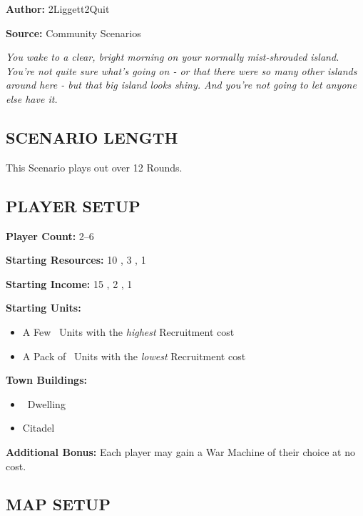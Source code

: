 
\begin{multicols*}{2}

\textbf{Author:} 2Liggett2Quit

\textbf{Source:} Community Scenarios

\textit{You wake to a clear, bright morning on your normally mist-shrouded island. You're not quite sure what's going on - or that there were so many other islands around here - but that big island looks shiny. And you're not going to let anyone else have it.}

\subsection*{\MakeUppercase{Scenario Length}}

This Scenario plays out over 12 Rounds.

\subsection*{\MakeUppercase{Player Setup}}
\textbf{Player Count:} 2--6

\textbf{Starting Resources:} 10 , 3 , 1 

\textbf{Starting Income:} 15 , 2 , 1 

\textbf{Starting Units:}
\begin{itemize}
  \item A Few \bronze\ Units with the \textit{highest} Recruitment cost
  \item A Pack of \bronze\ Units with the \textit{lowest} Recruitment cost
\end{itemize}

\textbf{Town Buildings:}
\begin{itemize}
  \item \bronze\ Dwelling
  \item Citadel
\end{itemize}

\textbf{Additional Bonus:} Each player may gain a War Machine of their choice at no cost.

\vspace*{\fill}
\columnbreak

\subsection*{\MakeUppercase{Map Setup}}


\end{multicols*}
